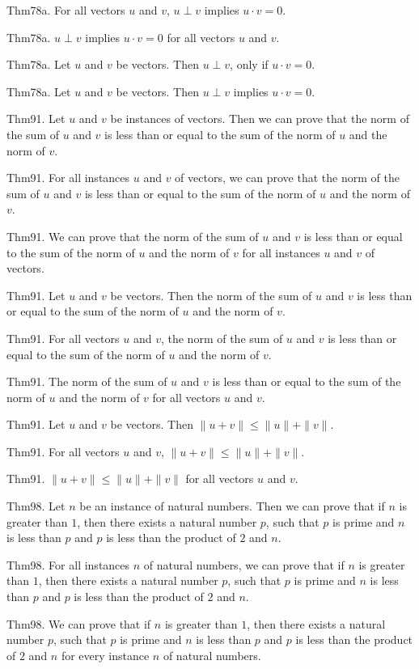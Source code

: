 \documentclass{article}
\begin{document}
Thm78a. For all vectors $u$ and $v$, $u \perp v$ implies $u \cdot v = 0$.

Thm78a. $u \perp v$ implies $u \cdot v = 0$ for all vectors $u$ and $v$.

Thm78a. Let $u$ and $v$ be vectors. Then $u \perp v$, only if $u \cdot v = 0$.

Thm78a. Let $u$ and $v$ be vectors. Then $u \perp v$ implies $u \cdot v = 0$.

Thm91. Let $u$ and $v$ be instances of vectors. Then we can prove that the norm of the sum of $u$ and $v$ is less than or equal to the sum of the norm of $u$ and the norm of $v$.

Thm91. For all instances $u$ and $v$ of vectors, we can prove that the norm of the sum of $u$ and $v$ is less than or equal to the sum of the norm of $u$ and the norm of $v$.

Thm91. We can prove that the norm of the sum of $u$ and $v$ is less than or equal to the sum of the norm of $u$ and the norm of $v$ for all instances $u$ and $v$ of vectors.

Thm91. Let $u$ and $v$ be vectors. Then the norm of the sum of $u$ and $v$ is less than or equal to the sum of the norm of $u$ and the norm of $v$.

Thm91. For all vectors $u$ and $v$, the norm of the sum of $u$ and $v$ is less than or equal to the sum of the norm of $u$ and the norm of $v$.

Thm91. The norm of the sum of $u$ and $v$ is less than or equal to the sum of the norm of $u$ and the norm of $v$ for all vectors $u$ and $v$.

Thm91. Let $u$ and $v$ be vectors. Then $\| u + v \| \leq \| u \| + \| v \|$.

Thm91. For all vectors $u$ and $v$, $\| u + v \| \leq \| u \| + \| v \|$.

Thm91. $\| u + v \| \leq \| u \| + \| v \|$ for all vectors $u$ and $v$.

Thm98. Let $n$ be an instance of natural numbers. Then we can prove that if $n$ is greater than $1$, then there exists a natural number $p$, such that $p$ is prime and $n$ is less than $p$ and $p$ is less than the product of $2$ and $n$.

Thm98. For all instances $n$ of natural numbers, we can prove that if $n$ is greater than $1$, then there exists a natural number $p$, such that $p$ is prime and $n$ is less than $p$ and $p$ is less than the product of $2$ and $n$.

Thm98. We can prove that if $n$ is greater than $1$, then there exists a natural number $p$, such that $p$ is prime and $n$ is less than $p$ and $p$ is less than the product of $2$ and $n$ for every instance $n$ of natural numbers.
\end{document}
